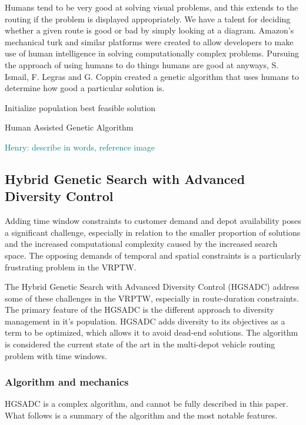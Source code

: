 \documentclass{sig-alternate}
\newcommand{\allcomments}[1]{{#1}}
\newcommand{\hfcomment}[1]{\textcolor{Teal}{\allcomments{Henry: {#1}}}}
\begin{document}
{Humans tend to be very good at solving visual problems, and this extends to the routing if the problem is displayed appropriately. We have a talent for deciding whether a given route is good or bad by simply looking at a diagram. Amazon's mechanical turk and similar platforms were created to allow developers to make use of human intelligence in solving computationally complex problems. Pursuing the approach of using humans to do things humans are good at anyways, S. Ismail, F. Legras and G. Coppin\cite{Ismail:2012} created a genetic algorithm that uses humans to determine how good a particular solution is. 


\begin{algorithm}
Initialize population\;
\Return best feasible solution\;
\caption{Human Assisted Genetic Algorithm\label{HUMGA}}
\end{algorithm}
\hfcomment{describe in words, reference image}
\subsection{Hybrid Genetic Search with Advanced Diversity Control}
Adding time window constraints to customer demand and depot availability poses a significant challenge, especially in relation to the smaller proportion of solutions and the increased computational complexity caused by the increased search space. The opposing demands of temporal and spatial constraints is a particularly frustrating problem in the VRPTW.

The Hybrid Genetic Search with Advanced Diversity Control (HGSADC) address some of these challenges in the VRPTW, especially in route-duration constraints. The primary feature of the HGSADC is the different approach to diversity management in it's population. HGSADC adds diversity to its objectives as a term to be optimized, which allows it to avoid dead-end solutions. The algorithm is considered the current state of the art in the multi-depot vehicle routing problem with time windows\cite{Vidal:2013}.

\subsubsection{Algorithm and mechanics}
HGSADC is a complex algorithm, and cannot be fully described in this paper. What follows is a summary of the algorithm and the most notable features.


}
\end{document}
